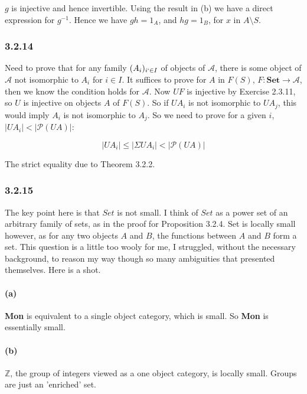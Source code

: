 \documentclass{article}
\begin{document}
$g$ is injective and hence invertible. Using the result in (b) we have a direct expression for $g^{-1}$. Hence we have $gh = 1_A$, and $hg = 1_B$, for $x$ in $A \setminus S$.

\subsubsection*{3.2.14}

Need to prove that for any family $(A_i)_{i `\in I}$  of objects of $\mathcal{A}$, there is some object of $\mathcal{A}$ not isomorphic to $A_i$ for $i \in I$.
It suffices to prove for $A$ in $F(S)$,  $F: \mathbf{Set} \rightarrow \mathcal{A}$, then we know the condition holds for $\mathcal{A}$. Now $UF$ is injective by Exercise 2.3.11,
so $U$ is injective on objects $A$ of $F(S)$. So if $UA_i$ is not isomorphic to $UA_j$, this would imply $A_i$ is not isomorphic to $A_j$. So we need to prove for a given $i$,  $|UA_i| < |\mathcal{P}(UA)|$:

\begin{equation*}
  |UA_i| \leq |\Sigma UA_i| < |\mathcal{P}(UA)|
\end{equation*}

The strict equality due to Theorem 3.2.2.

\subsubsection*{3.2.15}

The key point here is that $Set$ is not small. I think of $Set$ as a power set of an arbitrary family of sets, as in the proof for Proposition 3.2.4. Set is locally small however, as for any two objects $A$ and $B$, the functions between $A$ and $B$ form a set. This question is a little too wooly for me, I struggled, without the necessary background, to reason my way though so many ambiguities that presented themselves. Here is a shot.

\paragraph{(a)}
\textbf{Mon} is equivalent to a single object category, which is small. So \textbf{Mon} is essentially small.
\paragraph{(b)}
$\mathds{Z}$, the group of integers viewed as a one object category, is locally small. Groups are just an 'enriched' set.
\end{document}
